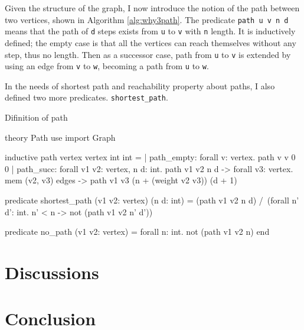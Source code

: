 \documentclass[a4paper,12pt]{article}
\begin{document}
Given the structure of the graph, I now introduce the notion of the
path between two vertices, shown in Algorithm \ref{alg:why3path}. The
predicate \texttt{path u v n d} means that the path of \texttt{d}
steps exists from \texttt{u} to \texttt{v} with \texttt{n} length. It
is inductively defined; the empty case is that all the vertices can
reach themselves without any step, thus no length. Then as a successor
case, path from \texttt{u} to \texttt{v} is extended by using an edge
from \texttt{v} to \texttt{w}, becoming a path from \texttt{u} to
\texttt{w}.

In the needs of shortest path and reachability property about paths, I
also defined two more predicates. \texttt{shortest\_path}.

\begin{algorithm}
\caption{Difinition of path}\label{alg:why3path}
\begin{why3}
theory Path
  use import Graph

  inductive path vertex vertex int int =
    | path_empty:
        forall v: vertex. path v v 0 0
    | path_succ:
        forall v1 v2: vertex, n d: int. path v1 v2 n d ->
        forall v3: vertex. mem (v2, v3) edges ->
        path v1 v3 (n + (weight v2 v3)) (d + 1)

  predicate shortest_path (v1 v2: vertex) (n d: int) =
    (path v1 v2 n d) /\
    (forall n' d': int. n' < n -> not (path v1 v2 n' d'))

  predicate no_path (v1 v2: vertex) =
    forall n: int. not (path v1 v2 n)
end
\end{why3}
\end{algorithm}



\section{Discussions}


\section{Conclusion}





\end{document}
